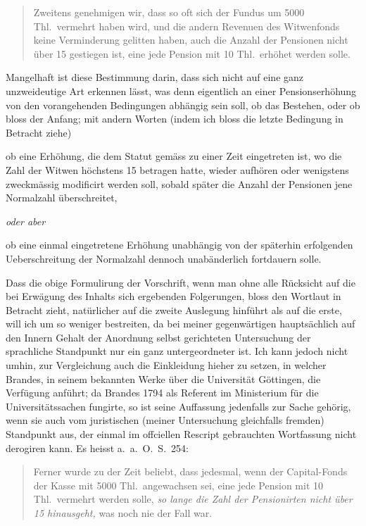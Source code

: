 \documentclass[12pt,a4paper]{article}
\begin{document}
\begin{quote}
Zweitens genehmigen wir, dass so oft sich der Fundus um 5000 Thl.\ vermehrt haben wird, und die andern Revenuen des Witwenfonds keine Verminderung gelitten haben, auch die Anzahl der Pensionen nicht \"uber 15 gestiegen ist, eine jede Pension mit 10 Thl.\ erh\"ohet werden solle.
\end{quote}

Mangelhaft ist diese Bestimmung darin, dass sich nicht auf eine ganz unzweideutige Art erkennen l\"asst, was denn eigentlich an einer Pensionserh\"ohung von den vorangehenden Bedingungen abh\"angig sein soll, ob das Bestehen, oder ob bloss der Anfang; mit andern Worten (indem ich bloss die letzte Bedingung in Betracht ziehe)

ob eine Erh\"ohung, die dem Statut gem\"ass zu einer Zeit eingetreten ist, wo die Zahl der Witwen h\"ochstens 15 betragen hatte, wieder aufh\"oren oder wenigstens zweckm\"assig modificirt werden soll, sobald sp\"ater die Anzahl der Pensionen jene Normalzahl \"uberschreitet,

\begin{center}\textit{oder aber}\end{center}

ob eine einmal eingetretene Erh\"ohung unabh\"angig von der sp\"aterhin erfolgenden Ueberschreitung der Normalzahl dennoch unab\"anderlich fortdauern solle.

Dass die obige Formulirung der Vorschrift, wenn man ohne alle R\"ucksicht auf die bei Erw\"agung des Inhalts sich ergebenden Folgerungen, bloss den Wortlaut in Betracht zieht, nat\"urlicher auf die zweite Auslegung hinf\"uhrt als auf die erste, will ich um so weniger bestreiten, da bei meiner gegenw\"artigen haupts\"achlich auf den Innern Gehalt der Anordnung selbst gerichteten Untersuchung der sprachliche Standpunkt nur ein ganz untergeordneter ist. Ich kann jedoch nicht umhin, zur Vergleichung auch die Einkleidung hieher zu setzen, in welcher Brandes, in seinem bekannten Werke \"uber die Universit\"at G\"ottingen, die Verf\"ugung anf\"uhrt; da Brandes 1794 als Referent im Ministerium f\"ur die Universit\"atssachen fungirte, so ist seine Auffassung jedenfalls zur Sache geh\"orig, wenn sie auch vom juristischen (meiner Untersuchung gleichfalls fremden) Standpunkt aus, der einmal im offciellen Rescript gebrauchten Wortfassung nicht derogiren kann. Es heisst a.\ a.\ O.\ S.\ 254:

\begin{quote}
Ferner wurde zu der Zeit beliebt, dass jedesmal, wenn der Capital-Fonds der Kasse mit 5000 Thl.\ angewachsen sei, eine jede Pension mit 10 Thl.\ vermehrt werden solle, \textit{so lange die Zahl der Pensionirten nicht \"uber 15 hinausgeht,} was noch nie der Fall war.
\end{quote}
\end{document}
